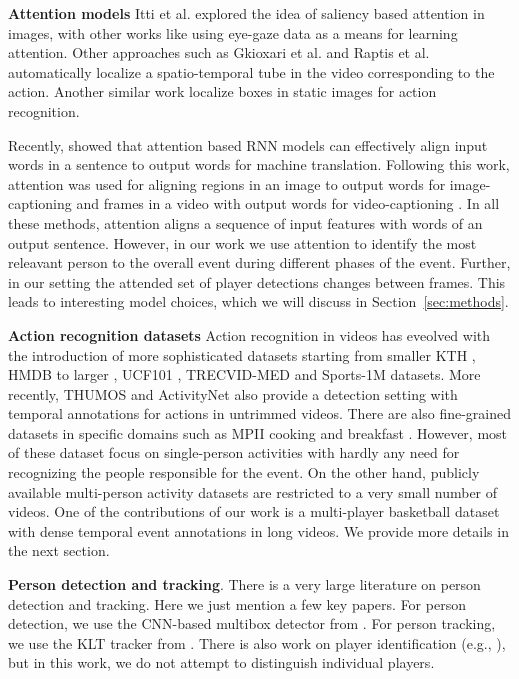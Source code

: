 \noindent \textbf{Attention models}
Itti et al. \cite{Itti_PAMI98} explored the idea of saliency based attention in
images, with other works like \cite{Shapovalova_NIPS13} using eye-gaze data as
a means for learning attention.
Other approaches such as Gkioxari et al. \cite{Gkioxari_arxiv14} and Raptis et al. \cite{Raptis_CVPR12}
automatically localize a spatio-temporal tube in the video corresponding to the action.
Another similar work\cite{Gkioxari_ICCV15} localize boxes in static images
for action recognition.

Recently, \cite{Bahdnau_arxiv14} showed that
attention based RNN models can effectively align input words in a sentence to
output words for machine translation.  Following this work, attention was used
for aligning regions in an image to output words for image-captioning
\cite{Xu_arxiv15} and frames in a video with output words for video-captioning
\cite{Yao_arxiv15}.  In all these methods, attention aligns a sequence of input
features with words of an output sentence. However, in our work we use
attention to identify the most releavant person to the overall event during
different phases of the event.  Further, in our setting the attended set of
player detections changes between frames. This leads to interesting
model choices, which we will discuss in Section~\ref{sec:methods}.

\noindent \textbf{Action recognition datasets}
Action recognition in videos has eveolved with the introduction of more
sophisticated datasets starting from smaller KTH \cite{KTH}, HMDB \cite{HMDB}
to larger , UCF101 \cite{UCF101}, TRECVID-MED \cite{MED11} and Sports-1M \cite{Karpathy_CVPR14}
datasets.
More recently, THUMOS \cite{THUMOS} and ActivityNet \cite{ActivityNet} also provide a detection
setting with temporal annotations for actions in untrimmed videos.
There are also fine-grained datasets
in specific domains such as MPII cooking \cite{Finegrained_cooking} and breakfast \cite{Breakfast}.
However, most of these dataset focus on single-person activities with hardly
any need for recognizing the people responsible for the event. On the other
hand, publicly available multi-person activity datasets \cite{Choi_ICCV09,Ryoo_10,VIRAT} are restricted
to a very small number of videos.  One of the contributions of our work is 
a multi-player basketball dataset with dense temporal event annotations in
long videos. We provide more details in the next section.

\noindent \textbf{Person detection and tracking}. There is a very
large literature on person detection and tracking. Here we just
mention a few key papers.
For person detection, we use the CNN-based multibox detector from
\cite{Szegedy13}.
For person tracking, we use the KLT tracker from
\cite{Veenman_PAMI2001}.
There is also work on player identification (e.g., \cite{Lu2013}), but
in this work, we do not attempt to distinguish individual players.
